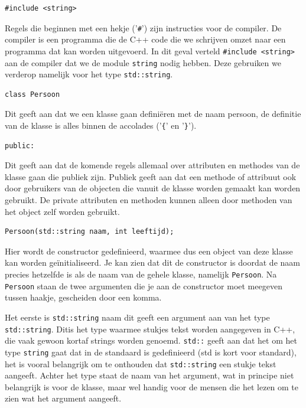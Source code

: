 \documentclass{article}
\begin{document}
\begin{lstlisting}[frame=none]
#include <string>
\end{lstlisting}

Regels die beginnen met een hekje ('\texttt{\#}') zijn instructies voor de compiler. De compiler is een programma die de C++ code die we schrijven omzet naar een programma dat kan worden uitgevoerd. In dit geval verteld \texttt{\#include <string>} aan de compiler dat we de module \texttt{string} nodig hebben. Deze gebruiken we verderop namelijk voor het type \texttt{std::string}.

\begin{lstlisting}[frame=none]
class Persoon 
\end{lstlisting}

Dit geeft aan dat we een klasse gaan definiëren met de naam persoon, de definitie van de klasse is alles binnen de accolades ('\texttt{\{}' en '\texttt{\}}').

\begin{lstlisting}[frame=none]
public:
\end{lstlisting}

Dit geeft aan dat de komende regels allemaal over attributen en methodes van de klasse gaan die publiek zijn. Publiek geeft aan dat een methode of attribuut ook door gebruikers van de objecten die vanuit de klasse worden gemaakt kan worden gebruikt. De private attributen en methoden kunnen alleen door methoden van het object zelf worden gebruikt.

\begin{lstlisting}[frame=none]
Persoon(std::string naam, int leeftijd);
\end{lstlisting}

Hier wordt de constructor gedefinieerd, waarmee dus een object van deze klasse kan worden geïnitialiseerd. Je kan zien dat dit de constructor is doordat de naam precies hetzelfde is als de naam van de gehele klasse, namelijk \texttt{Persoon}. Na \texttt{Persoon} staan de twee argumenten die je aan de constructor moet meegeven tussen haakje, gescheiden door een komma.

Het eerste is \texttt{std::string} naam dit geeft een argument aan van het type \texttt{std::string}. Ditis het type waarmee stukjes tekst worden aangegeven in C++, die vaak gewoon kortaf strings worden genoemd. \texttt{std::} geeft aan dat het om het type \texttt{string} gaat dat in de standaard is gedefinieerd (std is kort voor standard), het is vooral belangrijk om te onthouden dat \texttt{std::string} een stukje tekst aangeeft. Achter het type staat de naam van het argument, wat in principe niet belangrijk is voor de klasse, maar wel handig voor de mensen die het lezen om te zien wat het argument aangeeft.
\end{document}
